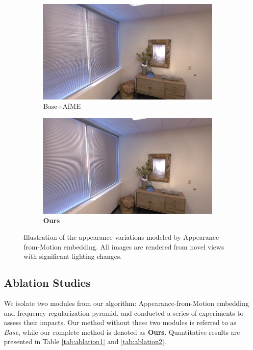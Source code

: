\begin{figure}[t]
	\centering
    \begin{subfigure}[ht]{0.495\linewidth}
        \includegraphics[width=1\linewidth]{fig/fig_FR/base+AfME/30000_73.jpg}
        \caption{Base+AfME}
    \end{subfigure}    \hspace{-1.5mm}
    \begin{subfigure}[ht]{0.495\linewidth}
        \includegraphics[width=1\linewidth]{fig/fig_FR/ours/30000_73.jpg}
        \caption{{\bf Ours}}
    \end{subfigure}    
	\caption{Illustration of the appearance variations  modeled by Appearance-from-Motion embedding. All images are rendered from novel views with significant lighting changes.}
	\label{fig:result_include1}
\end{figure}
\subsection{Ablation Studies}
We isolate two modules from our algorithm: Appearance-from-Motion embedding and frequency regularization pyramid, and conducted a series of experiments to assess their impacts. Our method without these two modules is referred to as \textit{Base}, while our complete method is denoted as \textbf{Ours}. Quantitative results are presented in Table \ref{tab:ablation1} and \ref{tab:ablation2}.
 
